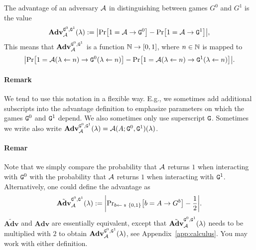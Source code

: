 \begin{definition}[Advantage]
The advantage of an adversary $\mathcal{A}$ in distinguishing between games $G^0$ and $G^1$ is the value
\[{\mathbf{Adv}}_{\adv}^{\M{G}^0,\M{G}^1}(\lambda) := \abs{\prob{1=\adv \circ \M{G}^0} - \prob{1 = \adv \circ \M{G}^1}},\]
This means that ${\mathbf{Adv}}_{\mathcal{A}}^{\text{\texttt{G}}^0,\text{\texttt{G}}^1}$ is a function $\mathbb{N}\rightarrow [0,1]$, where $n\in\mathbb{N}$ is mapped to
\begin{equation}\label{defeq:advantage}
\abs{\prob{1=\adv(\lambda\gets n) \circ \M{G}^0(\lambda\gets n)} - \prob{1 = \adv(\lambda\gets n) \circ \M{G}^1(\lambda\gets n)}}.
\end{equation}
\end{definition}
\paragraph{Remark} We tend to use this notation in a flexible way. E.g., we sometimes add additional subscripts into the advantage definition to emphasize parameters on which the games $\text{\texttt{G}}^0$ and  $\text{\texttt{G}}^1$ depend. We also sometimes only use superscript $\text{\texttt{G}}$. Sometimes we write also write ${\mathbf{Adv}}_{\mathcal{A}}^{\text{\texttt{G}}^0,\text{\texttt{G}}^1}(\lambda) = \mathcal{A}(A; \text{\texttt{G}}^0, \text{\texttt{G}}^1)(\lambda)$.
\paragraph{Remar} Note that we simply compare the probability that $\mathcal{A}$ returns $1$ when interacting with $\text{\texttt{G}}^0$ with the probability that $\mathcal{A}$ returns $1$ when interacting with $\text{\texttt{G}}^1$. Alternatively, one could define the advantage as
\[\tilde{\textbf{Adv}}_{\adv}^{\M{G}^0,\M{G}^1}(\lambda):=\abs{\probsub{b\sample\bin}{b = A \circ G^b} - \frac{1}{2}}.\]
$\tilde{\textbf{Adv}}$ and $\textbf{Adv}$ are essentially equivalent, except that $\tilde{\textbf{Adv}}^{\text{\texttt{G}}^0,\text{\texttt{G}}^1}_{\mathcal{A}}(\lambda)$ needs to be multiplied with $2$ to obtain $\textbf{Adv}^{\text{\texttt{G}}^0,\text{\texttt{G}}^1}_{\mathcal{A}}(\lambda)$, see Appendix~\ref{app:calculus}. You may work with either definition.

